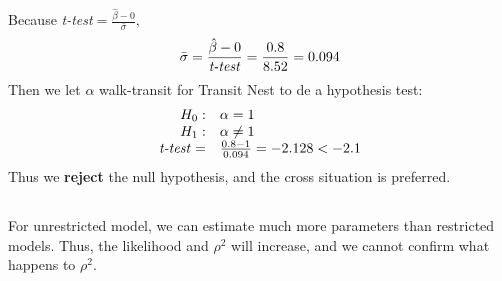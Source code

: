 \documentclass[11pt]{article}
\begin{document}
\section{}
\subsection{}
Because \textit{t-test}$=\frac{\hat{\beta}-0}{\bar{\sigma}}$,
\begin{equation}
\bar\sigma=\frac{\hat{\beta}-0}{\text{\textit{t-test}}}=\frac{0.8}{8.52}=0.094
\end{equation}
Then we let $\alpha$ walk-transit for Transit Nest to de a hypothesis test:
\begin{equation}
\begin{array}{rl}
H_0:&\alpha=1\\
H_1:&\alpha\neq1\\
\text{\textit{t-test}}=&\frac{0.8-1}{0.094}=-2.128<-2.1
\end{array}
\end{equation}
Thus we \textbf{reject} the null hypothesis, and the cross situation is preferred.
\subsection{}	
For unrestricted model, we can estimate much more parameters than restricted models. Thus, the likelihood and $\rho^2$ will increase, and we cannot confirm what happens to $\rho^2$.
\end{document}

